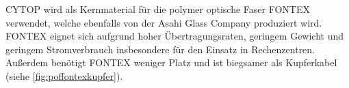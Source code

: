 CYTOP\textsuperscript{\texttrademark} wird als Kernmaterial für die polymer
optische Faser FONTEX\textsuperscript{\texttrademark} verwendet, welche
ebenfalls von der Asahi Glass Company produziert wird.
FONTEX\textsuperscript{\texttrademark} eignet sich aufgrund hoher
Übertragungsraten, geringem Gewicht und geringem Stromverbrauch insbesondere für
den Einsatz in Rechenzentren. Außerdem benötigt
FONTEX\textsuperscript{\texttrademark} weniger Platz und ist biegsamer als
Kupferkabel (siehe \autoref{fig:poffontexkupfer}). \cite{poffontex}
